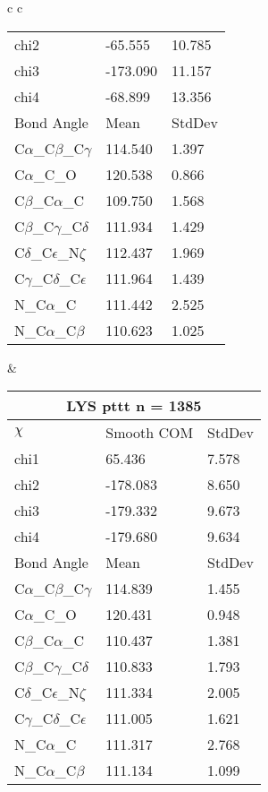\begin{longtable}{ c c }
\begin{tabular}{ l l l }
  chi2 & -65.555 & 10.785 \\ 
  chi3 & -173.090 & 11.157 \\ 
  chi4 & -68.899 & 13.356 \\ \midrule
  Bond Angle   & Mean     & StdDev \\ \midrule
  C$\alpha$\_C$\beta$\_C$\gamma$ & 114.540 & 1.397\\
  C$\alpha$\_C\_O & 120.538 & 0.866\\
  C$\beta$\_C$\alpha$\_C & 109.750 & 1.568\\
  C$\beta$\_C$\gamma$\_C$\delta$ & 111.934 & 1.429\\
  C$\delta$\_C$\epsilon$\_N$\zeta$ & 112.437 & 1.969\\
  C$\gamma$\_C$\delta$\_C$\epsilon$ & 111.964 & 1.439\\
  N\_C$\alpha$\_C & 111.442 & 2.525\\
  N\_C$\alpha$\_C$\beta$ & 110.623 & 1.025\\
  \bottomrule
  \end{tabular}
  &
  \begin{tabular}{ l l l }
  \toprule
  \multicolumn{3}{c}{LYS \textbf{pttt} n = 1385} \\ \toprule
  $\chi$       & Smooth COM & StdDev \\ \midrule
  chi1 & 65.436 & 7.578 \\ 
  chi2 & -178.083 & 8.650 \\ 
  chi3 & -179.332 & 9.673 \\ 
  chi4 & -179.680 & 9.634 \\ \midrule
  Bond Angle   & Mean     & StdDev \\ \midrule
  C$\alpha$\_C$\beta$\_C$\gamma$ & 114.839 & 1.455\\
  C$\alpha$\_C\_O & 120.431 & 0.948\\
  C$\beta$\_C$\alpha$\_C & 110.437 & 1.381\\
  C$\beta$\_C$\gamma$\_C$\delta$ & 110.833 & 1.793\\
  C$\delta$\_C$\epsilon$\_N$\zeta$ & 111.334 & 2.005\\
  C$\gamma$\_C$\delta$\_C$\epsilon$ & 111.005 & 1.621\\
  N\_C$\alpha$\_C & 111.317 & 2.768\\
  N\_C$\alpha$\_C$\beta$ & 111.134 & 1.099\\
  \bottomrule
  \end{tabular}
  \\
  \begin{tabular}{ l l l }

\end{tabular}
\end{longtable}
